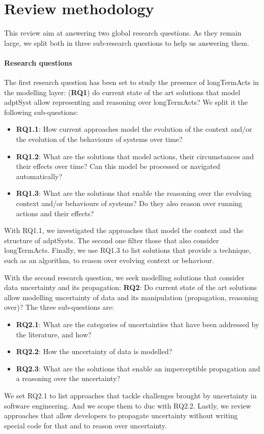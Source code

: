 \section{Review methodology}
\label{sec:sota:methodo}

This review aim at answering two global research questions.
As they remain large, we split both in three sub-research questions to help us answering them.

\paragraph{Research questions}
The first research question has been set to study the presence of \glspl{longTermAct} in the modelling layer: (\textbf{RQ1}) do current state of the art solutions that model \gls{adptSyst} allow representing and reasoning over \glspl{longTermAct}?
We split it the following sub-questions:
\begin{itemize}
	\item \textbf{RQ1.1}: How current approaches model the evolution of the context and/or the evolution of the behaviours of systems over time?
	\item \textbf{RQ1.2}: What are the solutions that model actions, their circumstances and their effects over time? Can this model be processed or navigated automatically?
	\item \textbf{RQ1.3}: What are the solutions that enable the reasoning over the evolving context and/or behaviours of systems? Do they also reason over running \glspl{action} and their effects?
\end{itemize}
With RQ1.1, we investigated the approaches that model the context and the structure of \glspl{adptSyst}.
The second one filter those that also consider \glspl{longTermAct}.
Finally, we use RQ1.3 to list solutions that provide a technique, such as an algorithm, to reason over evolving context or behaviour.

With the second research question, we seek modelling solutions that consider data uncertainty and its propagation: \textbf{RQ2}: Do current state of the art solutions allow modelling uncertainty of data and its manipulation (propagation, reasoning over)?
The three sub-questions are:
\begin{itemize}
	\item \textbf{RQ2.1}: What are the categories of uncertainties that have been addressed by the literature, and how?
	\item \textbf{RQ2.2}: How the uncertainty of data is modelled?
	\item \textbf{RQ2.3}: What are the solutions that enable an imperceptible propagation and a reasoning over the uncertainty?
\end{itemize}
We set RQ2.1 to list approaches that tackle challenges brought by uncertainty in software engineering.
And we scope them to \gls{duc} with RQ2.2.
Lastly, we review approaches that allow developers to propagate uncertainty without writing special code for that and to reason over uncertainty.

